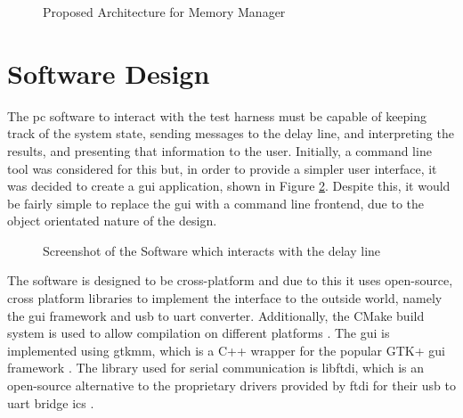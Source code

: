 \begin{figure}[ht]
	\caption{Proposed Architecture for Memory Manager}
	\label{fig:mem-manager-arch}
\end{figure}

\section{Software Design}  \label{sec:test-harness-sw}

The \gls{pc} software to interact with the test harness must be capable of keeping track of the system state, sending messages to the delay line, and interpreting the results, and presenting that information to the user. Initially, a command line tool was considered for this but, in order to provide a simpler user interface, it was decided to create a \gls{gui} application, shown in Figure \ref{fig:mem-gui-screenshot}. Despite this, it would be fairly simple to replace the \gls{gui} with a command line frontend, due to the object orientated nature of the design.

\begin{figure}[ht]
	\centering
	\caption{Screenshot of the Software which interacts with the delay line}
	\label{fig:mem-gui-screenshot}
\end{figure}

The software is designed to be cross-platform and due to this it uses open-source, cross platform libraries to implement the interface to the outside world, namely the \gls{gui} framework and \gls{usb} to \gls{uart} converter. Additionally, the CMake build system is used to allow compilation on different platforms \cite{cmake2017}. The \gls{gui} is implemented using gtkmm, which is a C++ wrapper for the popular GTK+ \gls{gui} framework \cite{cumming2017}. The library used for serial communication is libftdi, which is an open-source alternative to the proprietary drivers provided by \gls{ftdi} for their \gls{usb} to \gls{uart} bridge \glspl{ic} \cite{intra2net2017}.

